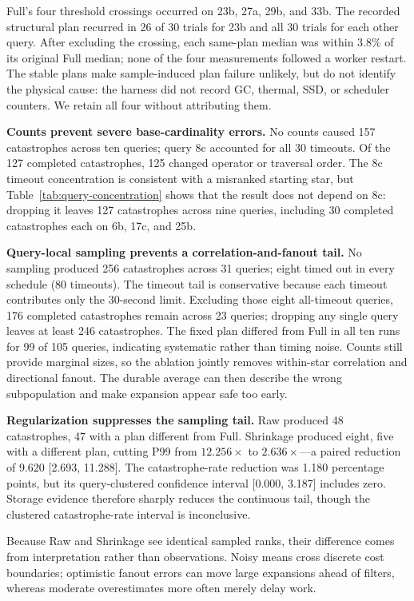 \documentclass[sigconf]{cidr-2027}
\begin{document}
Full's four threshold crossings occurred on 23b, 27a, 29b, and 33b. The
recorded structural plan recurred in 26 of 30 trials for 23b and all 30 trials
for each other query. After excluding the crossing, each same-plan median was
within 3.8\% of its original Full median; none of the four measurements followed
a worker restart. The stable plans make sample-induced plan failure unlikely,
but do not identify the physical cause: the harness did not record GC, thermal,
SSD, or scheduler counters. We retain all four without attributing them.

\textbf{Counts prevent severe base-cardinality errors.} No counts caused 157
catastrophes across ten queries; query 8c accounted for all 30 timeouts.
Of the 127 completed catastrophes, 125 changed operator or traversal order.
The 8c timeout concentration is consistent with a misranked starting star,
but Table~\ref{tab:query-concentration} shows that the result does not depend on
8c: dropping it leaves 127 catastrophes across nine queries, including 30
completed catastrophes each on 6b, 17c, and 25b.

\textbf{Query-local sampling prevents a correlation-and-fanout tail.} No
sampling produced 256 catastrophes across 31 queries; eight timed out in every
schedule (80 timeouts). The timeout tail is conservative because each timeout
contributes only the 30-second limit. Excluding those eight all-timeout queries,
176 completed catastrophes remain across 23 queries; dropping any single query
leaves at least 246 catastrophes. The fixed plan differed from Full in all ten
runs for 99 of 105 queries,
indicating systematic rather than timing noise.
Counts still provide marginal sizes, so the ablation jointly removes within-star
correlation and directional fanout. The durable average can then describe the
wrong subpopulation and make expansion appear safe too early.

\textbf{Regularization suppresses the sampling tail.}
Raw produced 48 catastrophes, 47 with a plan different from Full. Shrinkage
produced eight, five with a different plan, cutting P99 from $12.256\times$ to
$2.636\times$---a paired reduction of 9.620 [2.693, 11.288]. The
catastrophe-rate reduction was 1.180
percentage points, but its query-clustered confidence interval [0.000, 3.187]
includes zero. Storage evidence therefore sharply reduces the continuous
tail, though the clustered catastrophe-rate interval is inconclusive.

Because Raw and Shrinkage see identical sampled ranks, their difference comes
from interpretation rather than observations. Noisy means cross discrete cost
boundaries; optimistic fanout errors can move large expansions ahead of
filters, whereas moderate overestimates more often merely delay work.
\end{document}
